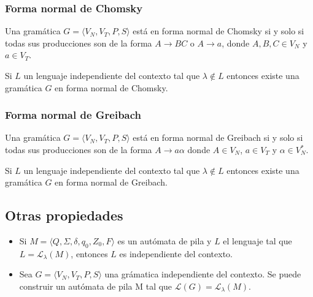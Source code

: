 \subsubsection{Forma normal de Chomsky}
Una gramática \(G = \langle V_N, V_T, P, S\rangle\) está en forma normal de Chomsky si y solo si todas sus producciones son de la forma \(A\to BC\) o \(A\to a\), donde \(A, B, C \in V_N\) y \(a \in V_T\).

Si \(L\) un lenguaje independiente del contexto tal que \(\lambda\notin L\) entonces existe una gramática \(G\) en forma normal de Chomsky.

\subsubsection{Forma normal de Greibach}
Una gramática \(G = \langle V_N, V_T, P, S\rangle\) está en forma normal de Greibach si y solo si todas sus producciones son de la forma \(A\to a\alpha\) donde \(A\in V_N\), \(a\in V_T\) y \(\alpha \in V_N^*\).

Si \(L\) un lenguaje independiente del contexto tal que \(\lambda\notin L\) entonces existe una gramática \(G\) en forma normal de Greibach.

\subsection{Otras propiedades}
\begin{itemize}
  \item Si \(M = \langle Q, \Sigma, \delta, q_0, Z_0, F\rangle\) es un autómata de pila y \(L\) el lenguaje tal que \(L = \mathcal{L}_\lambda(M)\), entonces \(L\) es independiente del contexto.
  \item Sea \(G = \langle V_N, V_T, P, S\rangle\) una grámatica independiente del contexto. Se puede construir un autómata de pila  M tal que \(\mathcal{L}(G) = \mathcal{L}_\lambda(M)\).
\end{itemize}